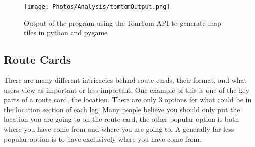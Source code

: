 \documentclass{article}
\begin{document}
        
            \lstset{style=mystyle}
            
            
            
            \begin{figure}[ht]
                \centering
                \texttt{[image: Photos/Analysis/tomtomOutput.png]}
                \caption{Output of the program using the TomTom API to generate map tiles in python and pygame}
                \label{fig:tomtom_output}
            \end{figure}
    

            

    \subsection{Route Cards}

        There are many different intricacies behind route cards, their format, and what users view as important or less important. One example of this is one of the key parts of a route card, the location. There are only 3 options for what could be in the location section of each leg. Many people believe you should only put the location you are going to on the route card, the other popular option is both where you have come from and where you are going to. A generally far less popular option is to have exclusively where you have come from.
\end{document}
